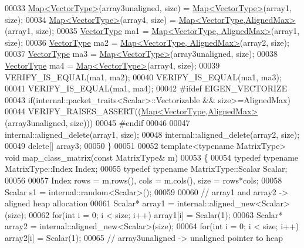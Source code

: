 \begin{DoxyCode}
00033   \hyperlink{group___core___module_class_eigen_1_1_map}{Map<VectorType>}(array3unaligned, size) = \hyperlink{group___core___module_class_eigen_1_1_map}{Map<VectorType>}(array1, size);
00034   \hyperlink{group___core___module_class_eigen_1_1_map}{Map<VectorType>}(array4, size)          = 
      \hyperlink{group___core___module_class_eigen_1_1_map}{Map<VectorType,AlignedMax>}(array1, size);
00035   \hyperlink{struct_vector_type}{VectorType} ma1 = \hyperlink{group___core___module_class_eigen_1_1_map}{Map<VectorType, AlignedMax>}(array1, size);
00036   \hyperlink{struct_vector_type}{VectorType} ma2 = \hyperlink{group___core___module_class_eigen_1_1_map}{Map<VectorType, AlignedMax>}(array2, size);
00037   \hyperlink{struct_vector_type}{VectorType} ma3 = \hyperlink{group___core___module_class_eigen_1_1_map}{Map<VectorType>}(array3unaligned, size);
00038   \hyperlink{struct_vector_type}{VectorType} ma4 = \hyperlink{group___core___module_class_eigen_1_1_map}{Map<VectorType>}(array4, size);
00039   VERIFY\_IS\_EQUAL(ma1, ma2);
00040   VERIFY\_IS\_EQUAL(ma1, ma3);
00041   VERIFY\_IS\_EQUAL(ma1, ma4);
00042 \textcolor{preprocessor}{  #ifdef EIGEN\_VECTORIZE}
00043   \textcolor{keywordflow}{if}(internal::packet\_traits<Scalar>::Vectorizable && size>=AlignedMax)
00044     VERIFY\_RAISES\_ASSERT((\hyperlink{group___core___module_class_eigen_1_1_map}{Map<VectorType,AlignedMax>}(array3unaligned, size)))
00045   \textcolor{preprocessor}{#endif}
00046 
00047   internal::aligned\_delete(array1, size);
00048   internal::aligned\_delete(array2, size);
00049   \textcolor{keyword}{delete}[] array3;
00050 \}
00051 
00052 \textcolor{keyword}{template}<\textcolor{keyword}{typename} MatrixType> \textcolor{keywordtype}{void} map\_class\_matrix(\textcolor{keyword}{const} MatrixType& m)
00053 \{
00054   \textcolor{keyword}{typedef} \textcolor{keyword}{typename} MatrixType::Index Index;
00055   \textcolor{keyword}{typedef} \textcolor{keyword}{typename} MatrixType::Scalar Scalar;
00056 
00057   Index rows = m.rows(), cols = m.cols(), size = rows*cols;
00058   Scalar s1 = internal::random<Scalar>();
00059 
00060   \textcolor{comment}{// array1 and array2 -> aligned heap allocation}
00061   Scalar* array1 = internal::aligned\_new<Scalar>(size);
00062   \textcolor{keywordflow}{for}(\textcolor{keywordtype}{int} i = 0; i < size; i++) array1[i] = Scalar(1);
00063   Scalar* array2 = internal::aligned\_new<Scalar>(size);
00064   \textcolor{keywordflow}{for}(\textcolor{keywordtype}{int} i = 0; i < size; i++) array2[i] = Scalar(1);
00065   \textcolor{comment}{// array3unaligned -> unaligned pointer to heap}

\end{DoxyCode}
